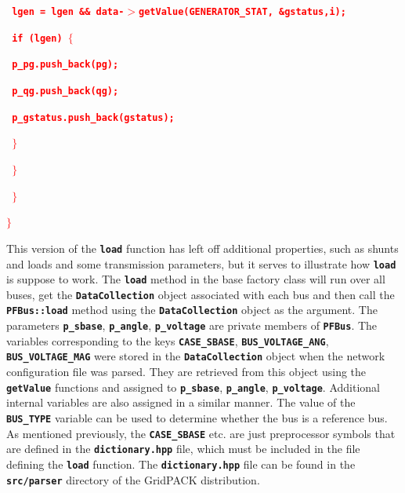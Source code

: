 \documentclass[12pt]{report} %
\begin{document}
\textcolor{red}{\texttt{\textbf{      lgen = lgen \&\& data-$\boldsymbol{\mathrm{>}}$getValue(GENERATOR\_STAT, \&gstatus,i);}}}

\textcolor{red}{\texttt{\textbf{      if (lgen) $\boldsymbol{\mathrm{\{}}$}}}

\textcolor{red}{\texttt{\textbf{        p\_pg.push\_back(pg);}}}

\textcolor{red}{\texttt{\textbf{        p\_qg.push\_back(qg);}}}

\textcolor{red}{\texttt{\textbf{        p\_gstatus.push\_back(gstatus);}}}

\textcolor{red}{\texttt{\textbf{      $\boldsymbol{\mathrm{\}}}$}}}

\textcolor{red}{\texttt{\textbf{    $\boldsymbol{\mathrm{\}}}$}}}

\textcolor{red}{\texttt{\textbf{  $\boldsymbol{\mathrm{\}}}$}}}

\textcolor{red}{\texttt{\textbf{$\boldsymbol{\mathrm{\}}}$}}}

This version of the \texttt{\textbf{load}} function has left off additional properties, such as shunts and loads and some transmission parameters, but it serves to illustrate how \texttt{\textbf{load}} is suppose to work. The \texttt{\textbf{load}} method in the base factory class will run over all buses, get the \texttt{\textbf{DataCollection}} object associated with each bus and then call the \texttt{\textbf{PFBus::load}} method using the \texttt{\textbf{DataCollection}} object as the argument. The parameters \texttt{\textbf{p\_sbase}}, \texttt{\textbf{p\_angle}}, \texttt{\textbf{p\_voltage}} are private members of \texttt{\textbf{PFBus}}. The variables corresponding to the keys \texttt{\textbf{CASE\_SBASE}}, \texttt{\textbf{BUS\_VOLTAGE\_ANG}}, \texttt{\textbf{BUS\_VOLTAGE\_MAG}} were stored in the \texttt{\textbf{DataCollection}} object when the network configuration file was parsed. They are retrieved from this object using the \texttt{\textbf{getValue}} functions and assigned to \texttt{\textbf{p\_sbase}}, \texttt{\textbf{p\_angle}}, \texttt{\textbf{p\_voltage}}. Additional internal variables are also assigned in a similar manner. The value of the \texttt{\textbf{BUS\_TYPE}} variable can be used to determine whether the bus is a reference bus. As mentioned previously, the \texttt{\textbf{CASE\_SBASE}} etc. are just preprocessor symbols that are defined in the \texttt{\textbf{dictionary.hpp}} file, which must be included in the file defining the \texttt{\textbf{load}} function. The \texttt{\textbf{dictionary.hpp}} file can be found in the \texttt{\textbf{src/parser}} directory of the GridPACK distribution.
\end{document}
